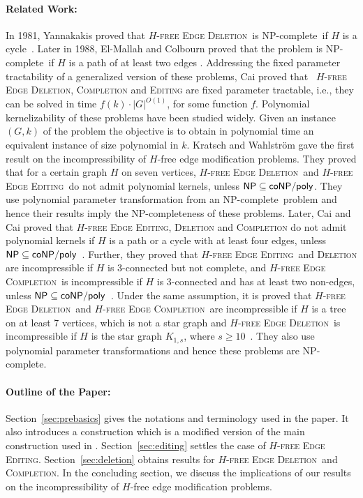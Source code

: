 \documentclass[envcountsame,envcountsect,10pt,oribibl]{llncs}
\newcommand{\pname}[1]{\textnormal{\textsc{#1}}}
\newcommand{\cclass}[1]{\textnormal{\textsf{#1}}}
\newcommand{\HED}{\pname{$H$-free Edge Deletion}}
\newcommand{\HEC}{\pname{$H$-free Edge Completion}}
\newcommand{\HEE}{\pname{$H$-free Edge Editing}}
\newcommand{\NPC}{\cclass{NP-complete}}
\newcommand{\PH}{$\cclass{NP} \subseteq \cclass{coNP/poly}$}
\begin{document}
\paragraph{\textbf{Related Work:}}
In 1981, Yannakakis proved that \HED\ is \NPC\
if $H$ is a cycle~\cite{DBLP:journals/siamcomp/Yannakakis81}. 
Later in 1988, El-Mallah and Colbourn proved that the problem
is \NPC\ if $H$ is a path of at least two edges \cite{el1988complexity}.
Addressing the fixed parameter tractability of a generalized version of these problems,
Cai proved that \cite{DBLP:journals/ipl/Cai96}~\HED, \textsc{Completion} and \textsc{Editing}
are fixed parameter tractable, i.e., they can be solved in time
$f(k)\cdot |G|^{O(1)}$, for some function $f$. 
Polynomial kernelizability of these problems
have been studied widely. 
Given an instance $(G,k)$ of the problem the objective is to 
obtain in polynomial time an equivalent instance of size
polynomial in $k$. Kratsch and Wahlstr{\"o}m gave the first result on the incompressibility of 
$H$-free edge modification problems. They proved that \cite{kratsch2009two} for a certain graph $H$
on seven vertices, \HED\ and \HEE\ do not admit polynomial kernels, unless \PH. They use
polynomial parameter transformation from an \NPC\ problem and hence their results imply the NP-completeness
of these problems. Later, Cai and Cai proved that 
\HEE, \textsc{Deletion} and \textsc{Completion} do not admit polynomial kernels
if $H$ is a path or a cycle with at least four edges, unless \PH~\cite{DBLP:journals/algorithmica/CaiC15}.
Further, they proved that \HEE\ and \textsc{Deletion} are incompressible if $H$ is 3-connected but not complete, 
and \HEC\ is incompressible if $H$ is 3-connected and has at least two non-edges,
unless \PH~\cite{DBLP:journals/algorithmica/CaiC15}.
Under the same assumption, 
it is proved that \HED\ and \HEC\ are incompressible if $H$ is a tree on at least 7 vertices, which is not a star graph and
\HED\ is incompressible if $H$ is the star graph $K_{1,s}$, where $s\geq 10$~\cite{cai2012polynomial}.
They also use polynomial parameter transformations and hence these problems
are \NPC. 



\paragraph{\textbf{Outline of the Paper:}}
Section~\ref{sec:prebasics} gives the notations and terminology used in the paper.
It also introduces a construction which is a modified version of the main
construction used in \cite{DBLP:conf/cocoa/AravindSS15}.
Section~\ref{sec:editing} settles the case of \HEE.
Section~\ref{sec:deletion} obtains results for \HED\ and \textsc{Completion}.
In the concluding section, we discuss the implications of our results on the 
incompressibility of $H$-free edge modification problems. 
\end{document}
